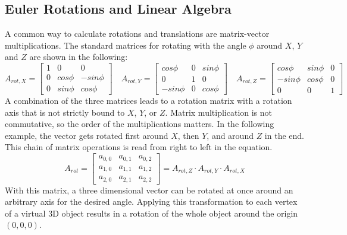 \subsection{Euler Rotations and Linear Algebra}
A common way to calculate rotations and translations are matrix-vector multiplications. The standard matrices for rotating with the angle $\phi$ around $X$, $Y$ and $Z$ are shown in the following:
\begin{equation*}
    A_{rot,X} = 
    \begin{bmatrix}
    1 & 0 & 0 \\
    0 & cos \phi & -sin \phi \\
    0 & sin \phi & cos \phi
    \end{bmatrix}
    \quad
    A_{rot,Y} = 
    \begin{bmatrix}
    cos \phi & 0 & sin \phi \\
    0 & 1 & 0 \\
    -sin \phi & 0 & cos \phi
    \end{bmatrix}    
    \quad
    A_{rot,Z} = 
    \begin{bmatrix}
    cos \phi & sin \phi & 0 \\
    -sin \phi & cos \phi & 0 \\
    0 & 0 & 1
    \end{bmatrix} 
\end{equation*}
A combination of the three matrices leads to a rotation matrix with a rotation axis that is not strictly bound to $X$, $Y$, or $Z$. Matrix multiplication is not commutative, so the order of the multiplications matters. In the following example, the vector gets rotated first around $X$, then $Y$, and around $Z$ in the end. This chain of matrix operations is read from right to left in the equation.
\begin{equation*}
    A_{rot} = 
    \begin{bmatrix}
    a_{0,0} & a_{0,1} & a_{0,2}  \\
    a_{1,0} & a_{1,1} & a_{1,2}  \\
    a_{2,0} & a_{2,1} & a_{2,2} 
    \end{bmatrix}
    =A_{rot,Z} \cdot A_{rot,Y} \cdot A_{rot,X}
\end{equation*}
With this matrix, a three dimensional vector can be rotated at once around an arbitrary axis for the desired angle. Applying this transformation to each vertex of a virtual 3D object results in a rotation of the whole object around the origin $(0,0,0)$.\\
